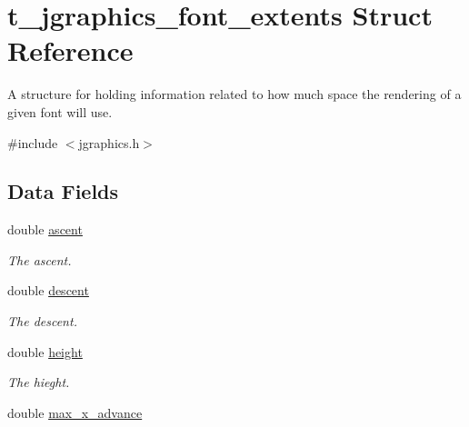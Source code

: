 \hypertarget{structt__jgraphics__font__extents}{
\section{t\_\-jgraphics\_\-font\_\-extents Struct Reference}
\label{structt__jgraphics__font__extents}
}


A structure for holding information related to how much space the rendering of a given font will use.  


{\ttfamily \#include $<$jgraphics.h$>$}\subsection*{Data Fields}
\begin{DoxyCompactItemize}
\item 
\hypertarget{structt__jgraphics__font__extents_abf6522eafd296b3d800ad2fb130ef673}{
double \hyperlink{structt__jgraphics__font__extents_abf6522eafd296b3d800ad2fb130ef673}{ascent}}
\label{structt__jgraphics__font__extents_abf6522eafd296b3d800ad2fb130ef673}

\begin{DoxyCompactList}\small\item\em The ascent. \item\end{DoxyCompactList}\item 
\hypertarget{structt__jgraphics__font__extents_a6828e1a138b6be881785b447e1ad094c}{
double \hyperlink{structt__jgraphics__font__extents_a6828e1a138b6be881785b447e1ad094c}{descent}}
\label{structt__jgraphics__font__extents_a6828e1a138b6be881785b447e1ad094c}

\begin{DoxyCompactList}\small\item\em The descent. \item\end{DoxyCompactList}\item 
\hypertarget{structt__jgraphics__font__extents_af187e59f203debcb25545a5427f0a105}{
double \hyperlink{structt__jgraphics__font__extents_af187e59f203debcb25545a5427f0a105}{height}}
\label{structt__jgraphics__font__extents_af187e59f203debcb25545a5427f0a105}

\begin{DoxyCompactList}\small\item\em The hieght. \item\end{DoxyCompactList}\item 
\hypertarget{structt__jgraphics__font__extents_a85145f466ded181a26f098f7f1ff376d}{
double \hyperlink{structt__jgraphics__font__extents_a85145f466ded181a26f098f7f1ff376d}{max\_\-x\_\-advance}}
\label{structt__jgraphics__font__extents_a85145f466ded181a26f098f7f1ff376d}


\end{DoxyCompactItemize}
